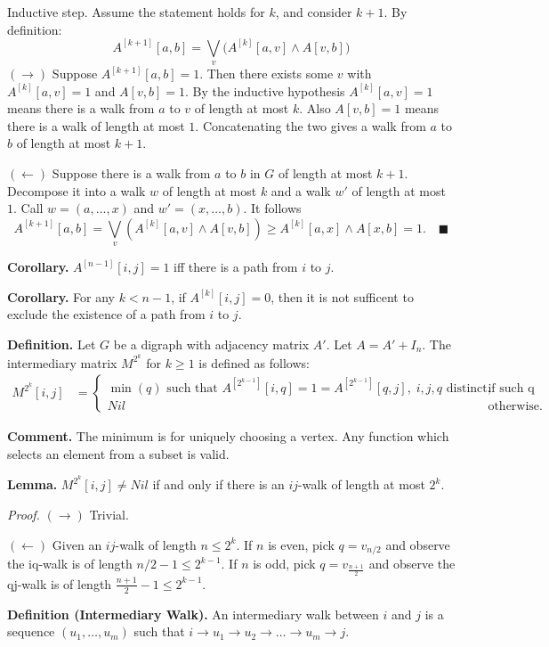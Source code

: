 \documentclass[pdflatex,sn-mathphys-num]{sn-jnl}%
\begin{document}
Inductive step. Assume the statement holds for $k$, and consider $k+1$. By definition:
$$
A^{[k+1]}[a,b] = \bigvee_{v} \big( A^{[k]}[a,v] \land A[v,b] \big)
$$
$(\rightarrow)$ Suppose $A^{[k+1]}[a,b] = 1$. Then there exists some $v$ with $A^{[k]}[a,v]=1$ and $A[v,b]=1$. By the inductive hypothesis $A^{[k]}[a,v]=1$ means there is a walk from $a$ to $v$ of length at most $k$. Also $A[v,b]=1$ means there is a walk of length at most $1$. Concatenating the two gives a walk from $a$ to $b$ of length at most $k+1$.

$(\leftarrow)$ Suppose there is a walk from $a$ to $b$ in $G$ of length at most $k+1$. Decompose it into a walk $w$ of length at most $k$ and a walk $w'$ of length at most $1$. Call $w = (a, \dots, x)$ and $w' = (x, \dots, b)$. It follows
$$
A^{[k+1]}[a,b] = \bigvee_{v}(A^{[k]}[a,v] \land A[v,b]) \ge A^{[k]}[a,x] \land A[x,b] = 1. \quad \blacksquare
$$

\textbf{Corollary.} $A^{[n-1]}[i,j] = 1$ iff there is a path from $i$ to $j$.

\textbf{Corollary.} For any $k < n-1$, if $A^{[k]}[i,j] = 0$, then it is not sufficent to exclude the existence of a path from $i$ to $j$.

\textbf{Definition.} Let $G$ be a digraph with adjacency matrix $A'$. Let $A = A' + I_n$. The intermediary matrix $M^{2^k}$ for $k \geq 1$ is defined as follows:
\begin{align*}
  M^{2^k}[i,j] &= \begin{cases} 
    \min(q) \text{ such that } A^{[2^{k-1}]}[i,q] = 1 = A^{[2^{k-1}]}[q,j], \; i,j,q \text{ distinct,} & \text{if such q exists} \\
    Nil & \text{otherwise.}
  \end{cases}
\end{align*}

\textbf{Comment.} The minimum is for uniquely choosing a vertex. Any function which selects an element from a subset is valid.

\textbf{Lemma.} $M^{2^k}[i,j] \neq Nil$ if and only if there is an $ij$-walk of length at most $2^k$.

\textit{Proof.} $(\rightarrow)$ Trivial.

$(\leftarrow)$ Given an $ij$-walk of length $n \leq 2^k$. If $n$ is even, pick $q = v_{n/2}$ and observe the iq-walk is of length $n/2 - 1 \leq 2^{k-1}$. If $n$ is odd, pick $q = v_{\frac{n+1}{2}}$ and observe the qj-walk is of length $\frac{n+1}{2} - 1 \leq 2^{k-1}$.

\textbf{Definition (Intermediary Walk).} An intermediary walk between $i$ and $j$ is a sequence $(u_1, \dots, u_m)$ such that $i \rightarrow u_1 \rightarrow u_2 \rightarrow \dots \rightarrow u_m \rightarrow j$.
\end{document}
